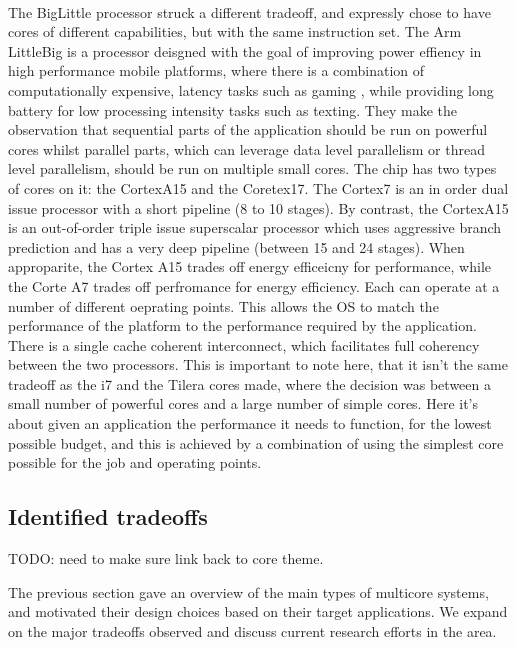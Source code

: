 \paragraph{} The BigLittle processor struck a different tradeoff,
and expressly chose to have cores of different capabilities, but
with the same instruction set. The Arm LittleBig is a processor
deisgned with the goal of improving power effiency in high
performance mobile platforms, where there is a combination
of computationally expensive, latency tasks such as gaming
, while providing long battery for low processing intensity tasks such
as texting. They make the observation that
sequential parts of the application should be run
on powerful cores whilst parallel parts, which can leverage data
level parallelism or thread level parallelism, should be run
on multiple small cores. The chip has two types of cores
on it: the CortexA15 and the Coretex17. The Cortex7 is an in order dual issue
processor with a short pipeline (8 to 10 stages). By contrast,  the CortexA15
 is an out-of-order triple issue superscalar processor
which uses aggressive branch prediction and has a very deep pipeline
(between 15 and 24 stages).  When approparite, the Cortex A15 trades off energy
efficeicny for performance, while the Corte A7 trades off perfromance for energy efficiency.
Each can operate at a number of different oeprating points. This allows the OS 
to match the performance of the platform to the performance required by the application. 
There is a single cache coherent interconnect,  which 
facilitates full coherency between the two processors. 
This is important to note here, that it isn't the same tradeoff
as the i7 and the Tilera cores made, where the decision was between
a small number of powerful cores and a large number of simple cores. 
Here it's about given an application the performance it needs to function,
for the lowest possible budget, and this is achieved by a combination of 
using the simplest core possible for the job and operating points. 

\subsection{Identified tradeoffs}
TODO: need to make sure link back to core theme. 

The previous section gave an overview of the main types of multicore systems, 
and motivated their design choices based on their target applications. 
We expand on the major tradeoffs observed and discuss current research efforts in the area. 
